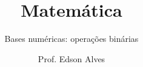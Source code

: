 \title{Matemática}
\subtitle{Bases numéricas: operações binárias}
\date{}
\author{Prof. Edson Alves}
